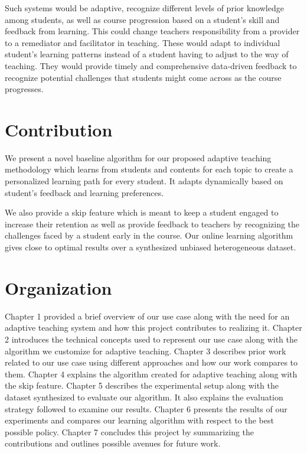 Such systems would be adaptive, recognize different levels of prior knowledge among students, as well as course progression based on a student's skill and feedback from learning. This could change teachers responsibility from a provider to a remediator and facilitator in teaching. These would adapt to individual student's learning patterns instead of a student having to adjust to the way of teaching. They would provide timely and comprehensive data-driven feedback to recognize potential challenges that students might come across as the course progresses.\par

\section{Contribution}

We present a novel baseline algorithm for our proposed adaptive teaching methodology which learns from students and contents for each topic to create a personalized learning path for every student. It adapts dynamically based on student's feedback and learning preferences.  \par

We also provide a skip feature which is meant to keep a student engaged to increase their retention as well as provide feedback to teachers by recognizing the challenges faced by a student early in the course. Our online learning algorithm gives close to optimal results over a synthesized unbiased heterogeneous dataset. \par

\newpage
\section{Organization}

Chapter 1 provided a brief overview of our use case along with the need for an adaptive teaching system and how this project contributes to realizing it. Chapter 2 introduces the technical concepts used to represent our use case along with the algorithm we customize for adaptive teaching. Chapter 3 describes prior work related to our use case using different approaches and how our work compares to them. Chapter 4 explains the algorithm created for adaptive teaching along with the skip feature. Chapter 5 describes the experimental setup along with the dataset synthesized to evaluate our algorithm. It also explains the evaluation strategy followed to examine our results. Chapter 6 presents the results of our experiments and compares our learning algorithm with respect to the best possible policy. Chapter 7 concludes this project by summarizing the contributions and outlines possible avenues for future work.
